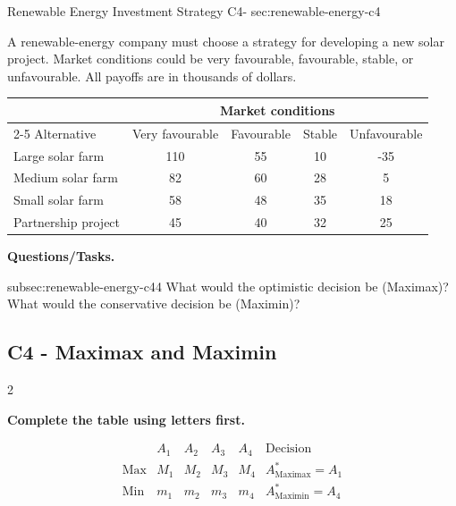 	\sectionScored
	{Renewable Energy Investment Strategy}
	{C4-}
	{sec:renewable-energy-c4}
	{
		A renewable-energy company must choose a strategy for developing a new
		solar project. Market conditions could be very favourable, favourable,
		stable, or unfavourable. All payoffs are in thousands of dollars.
		
		\begin{center}
			\renewcommand{\arraystretch}{1.3}
			\small
			\begin{tabular}{lcccc}
				\toprule
				& \multicolumn{4}{c}{Market conditions} \\
				\cmidrule(lr){2-5}
				Alternative & Very favourable & Favourable & Stable & Unfavourable \\
				\midrule
				Large solar farm & 110 & 55 & 10 & -35 \\
				Medium solar farm & 82 & 60 & 28 & 5 \\
				Small solar farm & 58 & 48 & 35 & 18 \\
				Partnership project & 45 & 40 & 32 & 25 \\
				\bottomrule
			\end{tabular}
		\end{center}
		\vspace{-5mm}
		
		\textbf{Questions/Tasks.}
		\begin{enumerate}
			\CriterionTask
			{subsec:renewable-energy-c4}{4}
			{What would the optimistic decision be (Maximax)? What would the conservative decision be (Maximin)? }
		\end{enumerate}
		
		\label{subsec:renewable-energy-c4}
		\subsection*{C4 - Maximax and Maximin }
		
		
		\begin{multicols}{2}
			
			\textbf{Complete the table using letters first.}
			
			\[
			\begin{array}{c|ccccc}
				& A_1 & A_2 & A_3 & A_4 & \text{Decision}\\
				\hline
				\text{Max} &
				M_1 & M_2 & M_3 & M_4 &
				A^*_{\mathrm{Maximax}}=A_1
				\\
				\text{Min} &
				m_1 & m_2 & m_3 & m_4 &
				A^*_{\mathrm{Maximin}}=A_4
			\end{array}
			\]
			

\end{multicols}}
